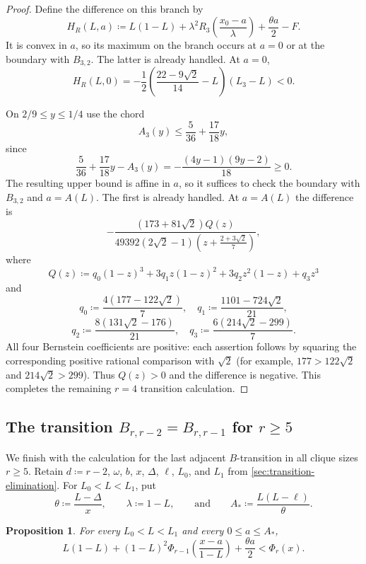 \documentclass[10pt]{article}
\numberwithin{equation}{section}
\newtheorem{proposition}[proposition]{Proposition}
\begin{document}
\begin{proof}
Define the difference on this branch by
\[
 H_R(L,a)\coloneqq
 L(1-L)+\lambda^2R_3\left(\frac{x_0-a}{\lambda}\right)
 +\frac{\theta a}{2}-F.
\]
It is convex in $a$, so its maximum on the branch occurs at $a=0$ or at the boundary with $B_{3,2}$.  The latter is already handled.  At $a=0$,
\[
 H_R(L,0)
 =-\frac12\left(\frac{22-9\sqrt2}{14}-L\right)(L_3-L)<0.
\]

On $2/9\le y\le1/4$ use the chord
\[
 A_3(y)\le\frac5{36}+\frac{17}{18}y,
\]
since
\[
 \frac5{36}+\frac{17}{18}y-A_3(y)
 =-\frac{(4y-1)(9y-2)}{18}\ge0.
\]
The resulting upper bound is affine in $a$, so it suffices to check the boundary with $B_{3,2}$ and $a=A(L)$.  The first is already handled.
At $a=A(L)$ the difference is
\[
 -\frac{(173+81\sqrt2)Q(z)}
 {49392(2\sqrt2-1)\left(z+\frac{2+3\sqrt2}{7}\right)},
\]
where
\[
 Q(z)\coloneqq q_0(1-z)^3+3q_1z(1-z)^2+3q_2z^2(1-z)+q_3z^3
\]
and
\[
 q_0\coloneqq\frac{4(177-122\sqrt2)}7,
 \quad
 q_1\coloneqq\frac{1101-724\sqrt2}{21},
\]
\[
 q_2\coloneqq\frac{8(131\sqrt2-176)}{21},
 \quad
 q_3\coloneqq\frac{6(214\sqrt2-299)}7.
\]
All four Bernstein coefficients are positive: each assertion follows by squaring the corresponding positive rational comparison with $\sqrt2$ (for example, $177>122\sqrt2$ and $214\sqrt2>299$).  Thus $Q(z)>0$ and the difference is negative.  This completes the remaining $r=4$ transition calculation.
\end{proof}

\subsection{The transition
\texorpdfstring{$B_{r,r-2}=B_{r,r-1}$ for $r\ge5$} {B(r,r-2) = B(r,r-1) for r at least 5}}\label{app:last-general-transition}

We finish with the calculation for the last adjacent $B$-transition in all clique sizes $r\ge5$.  Retain $d\coloneqq r-2$, $\omega$, $b$, $x$, $\Delta$, $\ell$, $L_0$, and $L_1$ from \cref{sec:transition-elimination}.  For $L_0<L<L_1$, put
\[
 \theta\coloneqq\frac{L-\Delta}{x},
 \qquad
 \lambda\coloneqq1-L,
 \qquad\text{and}\qquad
 A_*\coloneqq\frac{L(L-\ell)}{\theta}.
\]

\begin{proposition}\label{prop:last-general-transition-estimate}
For every $L_0<L<L_1$ and every $0\le a\le A_*$,
\[
 L(1-L)+(1-L)^2\Phi_{r-1}\left(\frac{x-a}{1-L}\right)
 +\frac{\theta a}{2}<\Phi_r(x).
\]
\end{proposition}
\end{document}
